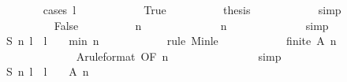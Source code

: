 \begin{isabellebody}
\ \ \ \ \ \ \isamarkupfalse%
\ {\isacharparenleft}cases\ {\isachardoublequoteopen}l\ {\isacharequal}\ {}{\isachardoublequoteclose}{\isacharparenright}\isanewline
\ \ \ \ \ \ \ \ \isamarkupfalse%
\ True\isanewline
\ \ \ \ \ \ \ \ \isamarkupfalse%
\ {\isacharquery}thesis\isanewline
\ \ \ \ \ \ \ \ \ \ \isamarkupfalse%
\ simp\isanewline
\ \ \ \ \ \ \isamarkupfalse%
\isanewline
\ \ \ \ \ \ \ \ \isamarkupfalse%
\ False\isanewline
\ \ \ \ \ \ \ \ \isamarkupfalse%
\ {\isachardoublequoteopen}n{\isacharminus}{}\ {\isasymge}\ {}{\isachardoublequoteclose}\isanewline
\ \ \ \ \ \ \ \ \ \ \isamarkupfalse%
\ {\isacharbackquoteopen}n\ {\isachargreater}\ {}{\isacharbackquoteclose}\isanewline
\ \ \ \ \ \ \ \ \ \ \isamarkupfalse%
\ simp\isanewline
\ \ \ \ \ \ \ \ \isamarkupfalse%
\ {\isachardoublequoteopen}{\isacharquery}S\ {\isacharparenleft}n{\isacharminus}{}{\isacharparenright}\ {\isacharparenleft}l{\isacharminus}{}{\isacharparenright}\ {\isacharslash}\ {\isacharparenleft}l\ {\isacharminus}\ {}{\isacharparenright}\ {\isasymge}\ {\isacharquery}min\ {\isacharparenleft}n\ {\isacharminus}\ {}{\isacharparenright}{\isachardoublequoteclose}\isanewline
\ \ \ \ \ \ \ \ \isamarkupfalse%
\ {\isacharparenleft}rule\ Min{\isacharunderscore}le{\isacharparenright}\isanewline
\ \ \ \ \ \ \ \ \ \ \isamarkupfalse%
\ {\isachardoublequoteopen}finite\ {\isacharparenleft}{\isacharquery}A\ {\isacharparenleft}n{\isacharminus}{}{\isacharparenright}{\isacharparenright}{\isachardoublequoteclose}\isanewline
\ \ \ \ \ \ \ \ \ \ \ \ \isamarkupfalse%
\ A{\isacharbrackleft}rule{\isacharunderscore}format{\isacharcomma}\ OF\ {\isacharbackquoteopen}n{\isacharminus}{}\ {\isasymge}\ {}{\isacharbackquoteclose}{\isacharbrackright}\isanewline
\ \ \ \ \ \ \ \ \ \ \ \ \isamarkupfalse%
\ simp\isanewline
\ \ \ \ \ \ \ \ \isamarkupfalse%
\isanewline
\ \ \ \ \ \ \ \ \ \ \isamarkupfalse%
\ {\isachardoublequoteopen}{\isacharquery}S\ {\isacharparenleft}n{\isacharminus}{}{\isacharparenright}\ {\isacharparenleft}l{\isacharminus}{}{\isacharparenright}\ {\isacharslash}\ {\isacharparenleft}l\ {\isacharminus}\ {}{\isacharparenright}\ {\isasymin}\ {\isacharquery}A\ {\isacharparenleft}n{\isacharminus}{}{\isacharparenright}{\isachardoublequoteclose}\isanewline

\end{isabellebody}
